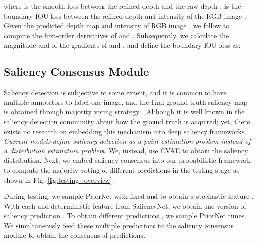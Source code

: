 \documentclass[10pt,twocolumn,letterpaper]{article}
\begin{document}
where  is the smooth  loss between the refined depth  and the raw depth ,  is the boundary IOU loss between the refined depth  and intensity  of the RGB image .
Given the predicted depth map  and intensity of RGB image , we follow \cite{Luo2017CVPR} to compute the first-order derivatives of  and . Subsequently, we calculate the magnitude  and  of the gradients of  and , and define the boundary IOU loss as:





\subsection{Saliency Consensus Module}
Saliency detection is subjective to some extent, and it is common to have multiple annotators to label one image, and the final ground truth saliency map is obtained through majority voting strategy \cite{sip_dataset}.
Although it is well known in the saliency detection community about how the ground truth is acquired; yet, there exists no research on embedding this mechanism into deep saliency frameworks. \textit{Current models define saliency detection as a point estimation problem instead of a distribution estimation problem}. We, instead, use CVAE to obtain the saliency distribution. Next, we embed saliency consensus into our probabilistic framework to compute the majority voting of different predictions in the testing stage as shown in Fig. \ref{fig:testing_overview}.








During testing, we sample PriorNet with fixed  and  to obtain a stochastic feature . With each  and deterministic feature  from SaliencyNet, we obtain one version of saliency prediction . To obtain  different predictions , we sample PriorNet  times.
We simultaneously feed these multiple predictions to the saliency consensus module to obtain the consensus of predictions.
\end{document}
